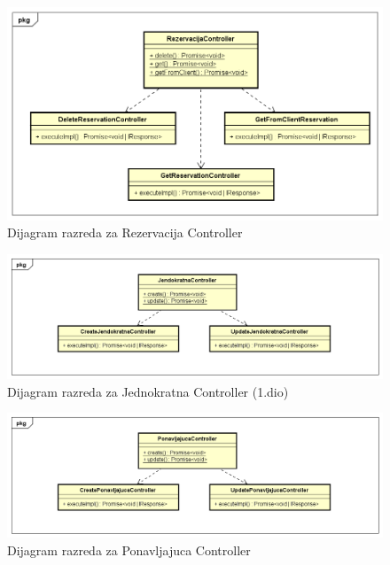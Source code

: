 		\begin{figure}[H]
			\includegraphics[width=1\linewidth]{dijagrami/Dijagram razreda - RezervacijaController.png}
			\caption{Dijagram razreda za Rezervacija Controller}
			\label{fig:Dijagram razreda - RezervacijaController} 
		\end{figure}
		
		\begin{figure}[H]
			\includegraphics[width=1\linewidth]{dijagrami/Dijagram razreda - JednokratnaController.png}
			\caption{Dijagram razreda za Jednokratna Controller (1.dio)}
			\label{fig:Dijagram razreda - JednokratnaController} 
		\end{figure}
		
		\begin{figure}[H]
			\includegraphics[width=1\linewidth]{dijagrami/Dijagram razreda - PonavljajucaController.png}
			\caption{Dijagram razreda za Ponavljajuca Controller}
			\label{fig:Dijagram razreda - PonavljajucaController} 
		\end{figure}
		
